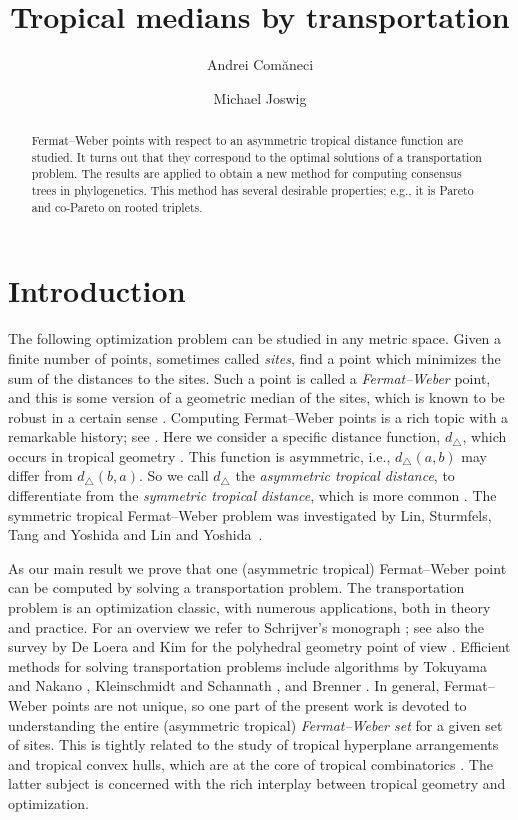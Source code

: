 \documentclass[a4paper,12pt]{amsart}
\title{Tropical medians by transportation}
\author{Andrei Com\u{a}neci \and Michael Joswig}
\theoremstyle{remark}
\begin{document}
\begin{abstract}
  Fermat--Weber points with respect to an asymmetric tropical distance function are studied.
  It turns out that they correspond to the optimal solutions of a transportation problem.
  The results are applied to obtain a new method for computing consensus trees in phylogenetics.
  This method has several desirable properties; e.g., it is Pareto and co-Pareto on rooted triplets.
\end{abstract}

\maketitle

\section{Introduction} \label{sec:intro}
\noindent
The following optimization problem can be studied in any metric space.
Given a finite number of points, sometimes called \emph{sites}, find a point which minimizes the sum of the distances to the sites.
Such a point is called a \emph{Fermat--Weber} point, and this is some version of a geometric median of the sites, which is known to be robust in a certain sense \cite[]{BMS:1999}. %
Computing Fermat--Weber points is a rich topic with a remarkable history; see \cite[Chapter~II]{BMS:1999}. %
Here we consider a specific distance function, $d_\triangle$, which occurs in tropical geometry \cite{RRlattice,LapLatticeGraph}. %
This function is asymmetric, i.e., $d_\triangle(a,b)$ may differ from $d_\triangle(b,a)$.
So we call $d_\triangle$ the \emph{asymmetric tropical distance}, to differentiate from the \emph{symmetric tropical distance}, which is more common \cite[]{ETC}.
The symmetric tropical Fermat--Weber problem was investigated by Lin, Sturmfels, Tang and Yoshida \cite{ConvTreeSp} and Lin and Yoshida~\cite{Lin-Yoshida:2018}.

As our main result we prove that one (asymmetric tropical) Fermat--Weber point can be computed by solving a transportation problem.
The transportation problem is an optimization classic, with numerous applications, both in theory and practice.
For an overview we refer to Schrijver's monograph \cite[]{Schrijver03:CO_A}; see also the survey by De Loera and Kim for the polyhedral geometry point of view \cite{DeLoera+Kim:2014}.
Efficient methods for solving transportation problems include algorithms by Tokuyama and Nakano \cite{Tokuyama+Nakano:1995}, Kleinschmidt and Schannath \cite{Kleinschmidt+Schannath:1995}, and Brenner \cite{Brenner:2008}.
In general, Fermat--Weber points are not unique, so one part of the present work is devoted to understanding the entire (asymmetric tropical) \emph{Fermat--Weber set} for a given set of sites.
This is tightly related to the study of tropical hyperplane arrangements and tropical convex hulls, which are at the core of tropical combinatorics \cite{ETC}.
The latter subject is concerned with the rich interplay between tropical geometry and optimization.
\end{document}
